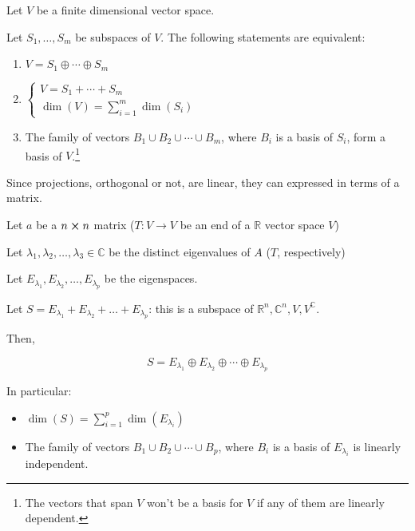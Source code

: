 \begin{theorem}
	Let $V$ be a finite dimensional vector space.

	Let $S_1, \ldots, S_m$ be subspaces of $V$. The following statements are equivalent:

	\begin{enumerate}
		\item $V = S_1 \oplus \cdots \oplus S_m$
		\item $\begin{cases}
			V = S_1 + \cdots + S_m\\
			\dim(V) = \sum_{i=1}^{m} \dim(S_i)
		\end{cases}$
		\item The family of vectors $B_1 \cup B_2 \cup \cdots \cup B_m$, where $B_i$ is a basis of $S_i$, form a basis of $V$.\footnote{The vectors that span $V$ won't be a basis for $V$ if any of them are linearly dependent.}
	\end{enumerate}
\end{theorem}

\begin{tcolorbox}
	Since projections, orthogonal or not, are linear, they can expressed in terms of a matrix.
\end{tcolorbox}

\begin{theorem}
	Let $a$ be a $n \cross n$ matrix ($T:V \to V$ be an end of a $\mathbb{R}$ vector space $V$)

	Let $\lambda_1, \lambda_2, \ldots, \lambda_3 \in \mathbb{C}$ be the distinct eigenvalues of $A$ ($T$, respectively)

	Let $E_{\lambda_1}, E_{\lambda_2}, \ldots, E_{\lambda_p}$ be the eigenspaces.

	Let $S = E_{\lambda_1}+ E_{\lambda_2}+ \ldots+ E_{\lambda_p}$: this is a subspace of $\mathbb{R}^n, \mathbb{C}^n, V, V^\mathbb{C}$.
		
	Then,

	\[S = E_{\lambda_1}\oplus E_{\lambda_2}\oplus \cdots\oplus E_{\lambda_p}\]

	In particular:

	\begin{itemize}
		\item $\dim(S) = \sum_{i=1}^{p} \dim(E_{\lambda_i})$
		\item The family of vectors $B_1 \cup B_2 \cup \cdots \cup B_p$, where $B_i$ is a basis of $E_{\lambda_i}$ is linearly independent.
	\end{itemize}
\end{theorem}

